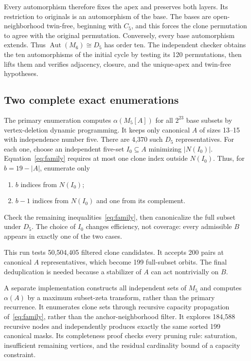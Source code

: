 \documentclass[11pt,letterpaper]{article}
\theoremstyle{remark}
\DeclareMathOperator{\Aut}{Aut}
\newcommand{\abs}[1]{\lvert #1\rvert}
\begin{document}
Every automorphism therefore fixes the apex and preserves both layers.
Its restriction to originals is an automorphism of the base. The bases
are open-neighborhood twin-free, beginning with $C_5$, and this forces
the clone permutation to agree with the original permutation. Conversely,
every base automorphism extends. Thus $\Aut(M_6)\cong D_5$ has order ten.
The independent checker obtains the ten automorphisms of the initial
cycle by testing its 120 permutations, then lifts them and verifies
adjacency, closure, and the unique-apex and twin-free hypotheses.

\subsection{Two complete exact enumerations}
The primary enumeration computes $\alpha(M_5[A])$ for all $2^{23}$ base
subsets by vertex-deletion dynamic programming. It keeps only canonical
$A$ of sizes 13--15 with independence number five. There are 4,370 such
$D_5$ representatives. For each one, choose an independent five-set
$I_0\subseteq A$ minimizing $\abs{N(I_0)}$. Equation~\eqref{eq:family}
requires at most one clone index outside $N(I_0)$. Thus, for
$b=19-\abs A$, enumerate only
\begin{enumerate}
\item $b$ indices from $N(I_0)$;
\item $b-1$ indices from $N(I_0)$ and one from its complement.
\end{enumerate}
Check the remaining inequalities~\eqref{eq:family}, then canonicalize the
full subset under $D_5$. The choice of $I_0$ changes efficiency, not
coverage: every admissible $B$ appears in exactly one of the two cases.

This run tests 50,504,405 filtered clone candidates. It accepts 200 pairs
at canonical $A$ representatives, which become 199 full-subset orbits.
The final deduplication is needed because a stabilizer of $A$ can act
nontrivially on $B$.

A separate implementation constructs all independent sets of $M_5$ and
computes $\alpha(A)$ by a maximum subset-zeta transform, rather than the
primary recurrence. It enumerates clone sets through recursive capacity
propagation of~\eqref{eq:family}, rather than the anchor-neighborhood
filter. It explores 184,588 recursive nodes and independently produces
exactly the same sorted 199 canonical masks. Its completeness proof
checks every pruning rule: saturation, insufficient remaining vertices,
and the residual cardinality bound of a capacity constraint.
\end{document}
